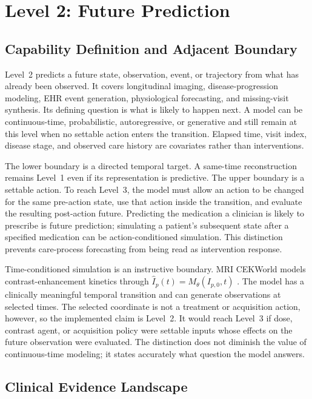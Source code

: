 \section{Level 2: Future Prediction}
\label{sec:level2}

\subsection{Capability Definition and Adjacent Boundary}

Level~2 predicts a future state, observation, event, or trajectory from what has already been observed. It covers longitudinal imaging, disease-progression modeling, EHR event generation, physiological forecasting, and missing-visit synthesis. Its defining question is what is likely to happen next. A model can be continuous-time, probabilistic, autoregressive, or generative and still remain at this level when no settable action enters the transition. Elapsed time, visit index, disease stage, and observed care history are covariates rather than interventions.

The lower boundary is a directed temporal target. A same-time reconstruction remains Level~1 even if its representation is predictive. The upper boundary is a settable action. To reach Level~3, the model must allow an action to be changed for the same pre-action state, use that action inside the transition, and evaluate the resulting post-action future. Predicting the medication a clinician is likely to prescribe is future prediction; simulating a patient's subsequent state after a specified medication can be action-conditioned simulation. This distinction prevents care-process forecasting from being read as intervention response.

Time-conditioned simulation is an instructive boundary. MRI CEKWorld models contrast-enhancement kinetics through $\hat I_p(t)=M_\theta(I_{p,0},t)$ \citep{Kong2026MRIContrastEnhancement}. The model has a clinically meaningful temporal transition and can generate observations at selected times. The selected coordinate is not a treatment or acquisition action, however, so the implemented claim is Level~2. It would reach Level~3 if dose, contrast agent, or acquisition policy were settable inputs whose effects on the future observation were evaluated. The distinction does not diminish the value of continuous-time modeling; it states accurately what question the model answers.

\subsection{Clinical Evidence Landscape}

